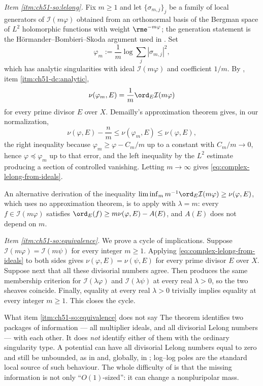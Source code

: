 \emph{Item \cref{itm:ch51-so:lelong}.}  Fix \(m\geq1\) and let
\(\{\sigma_{m,j}\}_j\) be a family of local generators of
\(\mathcal I(m\varphi)\) obtained from an orthonormal basis of the
Bergman space of \(L^2\) holomorphic functions with weight
\(\rme^{-m\varphi}\); the generation statement is the
H\"ormander--Bombieri--Skoda argument used in \cite{Dem92reg}.  Set
\[
 \varphi_m:=\frac1m\log\sum_j|\sigma_{m,j}|^2 ,
\]
which has analytic singularities with ideal \(\mathcal I(m\varphi)\) and
coefficient \(1/m\).  By , item
\cref{itm:ch51-dc:analytic},
\[
 \nu(\varphi_m,E)=\frac1m\ord_E\mathcal I(m\varphi)
\]
for every prime divisor \(E\) over \(X\).  Demailly's approximation
theorem \cite{Dem92reg} gives, in our normalization,
\[
 \nu(\varphi,E)-\frac nm\leq\nu(\varphi_m,E)\leq\nu(\varphi,E),
\]
the right inequality because \(\varphi_m\geq\varphi-C_m/m\) up to a
constant with \(C_m/m\to0\), hence \(\varphi\preceq\varphi_m\) up to that
error, and the left inequality by the \(L^2\) estimate producing a section
of controlled vanishing.  Letting \(m\to\infty\) gives
\eqref{eq:complex-lelong-from-ideals}.

An alternative derivation of the inequality
\(\liminf_m m^{-1}\ord_E\mathcal I(m\varphi)\geq\nu(\varphi,E)\), which
uses no approximation theorem, is to apply
 with \(\lambda=m\): every
\(f\in\mathcal I(m\varphi)\) satisfies
\(\ord_E(f)\geq m\nu(\varphi,E)-A(E)\), and \(A(E)\) does not depend on
\(m\).

\emph{Item \cref{itm:ch51-so:equivalence}.}  We prove a cycle of
implications.  Suppose \(\mathcal I(m\varphi)=\mathcal I(m\psi)\) for
every integer \(m\geq1\).  Applying
\eqref{eq:complex-lelong-from-ideals} to both sides gives
\(\nu(\varphi,E)=\nu(\psi,E)\) for every prime divisor \(E\) over \(X\).
Suppose next that all these divisorial numbers agree.  Then
 produces the same membership
criterion for \(\mathcal I(\lambda\varphi)\) and
\(\mathcal I(\lambda\psi)\) at every real \(\lambda>0\), so the two
sheaves coincide.  Finally, equality at every real \(\lambda>0\)
trivially implies equality at every integer \(m\geq1\).  This closes the
cycle.

\begin{warning}{What item \cref{itm:ch51-so:equivalence} does not say}
\label{warn:ch51-so-scope}
The theorem identifies two packages of information --- all multiplier
ideals, and all divisorial Lelong numbers --- with each other.  It does
\emph{not} identify either of them with the ordinary singularity type.  A
potential can have all divisorial Lelong numbers equal to zero and still
be unbounded, as in  and, globally, in
; log--log poles are the standard local source of
such behaviour.  The whole difficulty of  is that
the missing information is not only ``\(O(1)\)-sized'': it can change a
nonpluripolar mass.
\end{warning}

